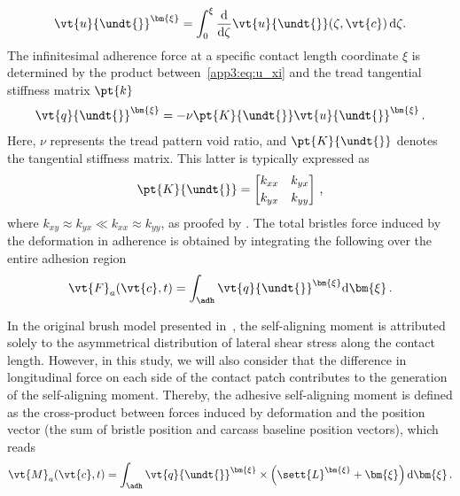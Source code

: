%
\begin{equation}
  \vt{u}{\undt{}}^{\bm{\xi}} = \int_0^\xi \dfrac{\mathrm{d}}{\mathrm{d}\zeta}\vt{u}{\undt{}}(\zeta,\vt{c}) \,\mathrm{d}\zeta.
  \label{app3:eq:u_xi}
\end{equation}
%
The infinitesimal adherence force at a specific contact length coordinate $\xi$ is determined by the product between~\eqref{app3:eq:u_xi} and the tread tangential stiffness matrix $\pt{k}$
%
\begin{equation*}
  \vt{q}{\undt{}}^{\bm{\xi}} = -\nu\pt{K}{\undt{}}\vt{u}{\undt{}}^{\bm{\xi}} \, \text{.}
\end{equation*}
%
Here, $\nu$ represents the tread pattern void ratio, and $\pt{K}{\undt{}}$ denotes the tangential stiffness matrix. This latter is typically expressed as
%
\begin{equation*}
  \pt{K}{\undt{}} =
  \begin{bmatrix}
    k_{xx} & k_{yx} \\[0.2em]
    k_{yx} & k_{yy}
  \end{bmatrix} \, \text{,}
\end{equation*}
%
where $k_{xy} \approx k_{yx} \ll k_{xx} \approx k_{yy}$, as proofed by \citet{okonieski2003simpified}. The total bristles force induced by the deformation in adherence is obtained by integrating the following over the entire adhesion region \adh{}
%
\begin{equation}
  \vt{F}_a(\vt{c},t) = \int_{\adh} \vt{q}{\undt{}}^{\bm{\xi}} \mathrm{d}\bm{\xi} \, \text{.}
  \label{app3:eq:F_a}
\end{equation}

In the original brush model presented in~\cite{pacejka2012tire}, the self-aligning moment is attributed solely to the asymmetrical distribution of lateral shear stress along the contact length. However, in this study, we will also consider that the difference in longitudinal force on each side of the contact patch contributes to the generation of the self-aligning moment. Thereby, the adhesive self-aligning moment is defined as the cross-product between forces induced by deformation and the position vector (the sum of bristle position and carcass baseline position vectors), which reads
%
\begin{equation}
  \vt{M}_{a}(\vt{c},t) = \int_{\adh} \vt{q}{\undt{}}^{\bm{\xi}} \times \left(\sett{L}^{\bm{\xi}} + \bm{\xi}\right) \mathrm{d}\bm{\xi} \, \text{.}
  \label{app3:eq:M_a}
\end{equation}


